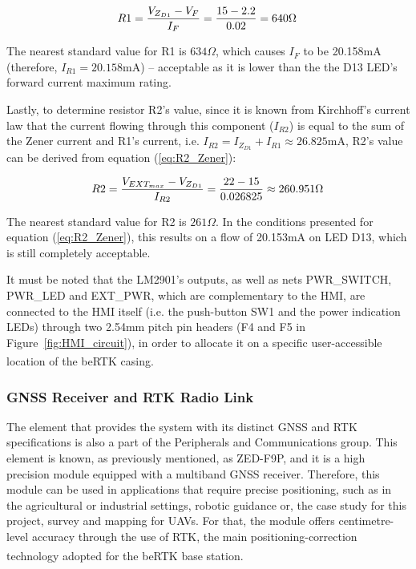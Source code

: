 \begin{equation}\label{eq:R1_Zener}
	R1=\frac{V_{Z_{D1}} - V_F}{I_F}=\frac{15 - 2.2}{0.02}=640\Omega \,\medskip
\end{equation}

The nearest standard value for R1 is $634 \Omega$, which causes $I_F$ to be 20.158mA (therefore, $I_{R1}=20.158$mA) -- acceptable as it is lower than the the D13 LED's forward current maximum rating.

Lastly, to determine resistor R2's value, since it is known from Kirchhoff's current law that the current flowing through this component ($I_{R2}$) is equal to the sum of the Zener current and R1's current, i.e. $I_{R2}=I_{Z_{D1}}+I_{R1} \approx 26.825$mA, R2's value can be derived from equation (\ref{eq:R2_Zener}):

\begin{equation}\label{eq:R2_Zener}
	R2 = \frac{V_{EXT_{max}} - V_{Z_{D1}}}{I_{R2}} = \frac{22 - 15}{0.026825} \approx 260.951 \Omega \,\medskip
\end{equation}

The nearest standard value for R2 is $261 \Omega$. In the conditions presented for equation (\ref{eq:R2_Zener}), this results on a flow of 20.153mA on LED D13, which is still completely acceptable.

It must be noted that the LM2901's outputs, as well as nets PWR\_SWITCH, PWR\_LED and EXT\_PWR, which are complementary to the HMI, are connected to the HMI itself (i.e. the push-button SW1 and the power indication LEDs) through two 2.54mm pitch pin headers (F4 and F5 in Figure~\ref{fig:HMI_circuit}), in order to allocate it on a specific user-accessible location of the beRTK\textsuperscript{\textregistered} casing.


\subsubsection{GNSS Receiver and RTK Radio Link}\label{sec:3232_ZEDF9P}

The element that provides the system with its distinct GNSS and RTK specifications is also a part of the Peripherals and Communications group. This element is known, as previously mentioned, as ZED-F9P, and it is a high precision module equipped with a multiband GNSS receiver. Therefore, this module can be used in applications that require precise positioning, such as in the agricultural or industrial settings, robotic guidance or, the case study for this project, survey and mapping for UAVs. For that, the module offers centimetre-level accuracy through the use of RTK, the main positioning-correction technology adopted for the beRTK\textsuperscript{\textregistered} base station.

